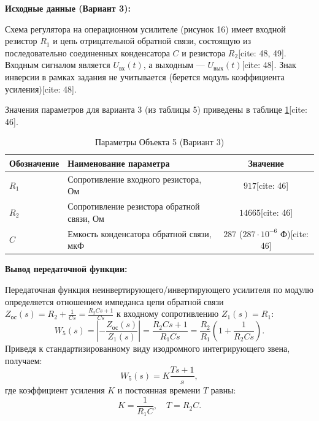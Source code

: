 \documentclass[12pt, a4paper]{article}
\begin{document}
\textbf{Исходные данные (Вариант 3):}

Схема регулятора на операционном усилителе (рисунок 16) имеет входной резистор $R_1$ и цепь отрицательной обратной связи, состоящую из последовательно соединенных конденсатора $C$ и резистора $R_2$[cite: 48, 49]. Входным сигналом является $U_{\text{вх}}(t)$, а выходным — $U_{\text{вых}}(t)$[cite: 48]. Знак инверсии в рамках задания не учитывается (берется модуль коэффициента усиления)[cite: 48].

Значения параметров для варианта 3 (из таблицы 5) приведены в таблице \ref{tab:obj5_params}[cite: 46].

\begin{table}[H]
\centering
\caption{Параметры Объекта 5 (Вариант 3)}
\label{tab:obj5_params}
\setlength{\tabcolsep}{10pt} 
\renewcommand{\arraystretch}{1.3} 
\begin{tabular}{@{} >{\raggedright\arraybackslash}p{3.5cm} >{\raggedright\arraybackslash}p{7.5cm} c @{}}
\toprule
\textbf{Обозначение} & \textbf{Наименование параметра} & \textbf{Значение} \\ \midrule
$R_1$ & Сопротивление входного резистора, $\text{Ом}$ & $917$[cite: 46] \\
$R_2$ & Сопротивление резистора обратной связи, $\text{Ом}$ & $14665$[cite: 46] \\
$C$   & Емкость конденсатора обратной связи, $\text{мкФ}$ & $287$ ($287 \cdot 10^{-6} \text{ Ф}$)[cite: 46] \\ \bottomrule
\end{tabular}
\end{table}

\textbf{Вывод передаточной функции:}

Передаточная функция неинвертирующего/инвертирующего усилителя по модулю определяется отношением импеданса цепи обратной связи $Z_{\text{ос}}(s) = R_2 + \frac{1}{Cs} = \frac{R_2Cs + 1}{Cs}$ к входному сопротивлению $Z_1(s) = R_1$:
\begin{equation*}
    W_5(s) = \left| -\frac{Z_{\text{ос}}(s)}{Z_1(s)} \right| = \frac{R_2Cs + 1}{R_1Cs} = \frac{R_2}{R_1}\left(1 + \frac{1}{R_2Cs}\right).
\end{equation*}
Приведя к стандартизированному виду изодромного интегрирующего звена, получаем:
\begin{equation}
    W_5(s) = K \frac{Ts + 1}{s},
\end{equation}
где коэффициент усиления $K$ и постоянная времени $T$ равны:
\begin{equation*}
    K = \frac{1}{R_1 C}, \quad T = R_2 C.
\end{equation*}
\end{document}
